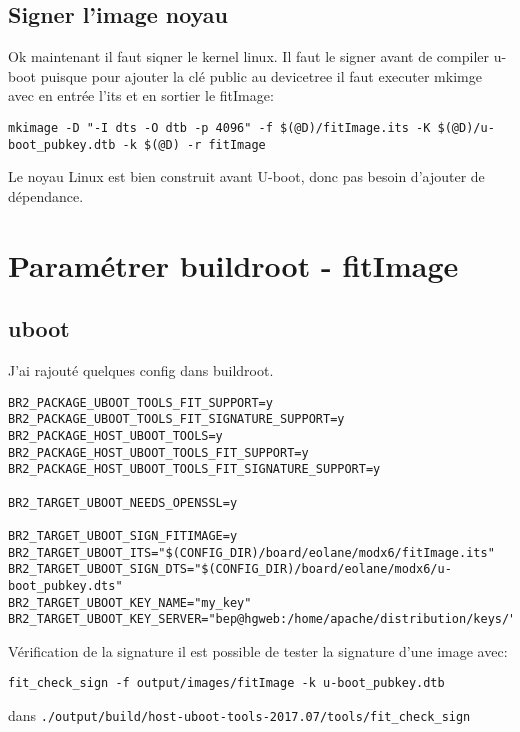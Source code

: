 \documentclass[compress,aspectratio=169]{beamer}
\begin{document}
\subsection{Signer l'image noyau}
\begin{frame}[fragile]
Ok maintenant il faut siqner le kernel linux.\newline
Il faut le signer avant de compiler u-boot puisque pour ajouter la clé public au devicetree il faut executer mkimge avec en entrée l'its et en sortier le fitImage:
\begin{lstlisting}[style=shell]
mkimage -D "-I dts -O dtb -p 4096" -f $(@D)/fitImage.its -K $(@D)/u-boot_pubkey.dtb -k $(@D) -r fitImage
\end{lstlisting}
Le noyau Linux est bien construit avant U-boot, donc pas besoin d'ajouter de dépendance.
\end{frame}

\section{Paramétrer buildroot - fitImage}

\subsection{uboot}
\begin{frame}[fragile]
J'ai rajouté quelques config dans buildroot.
\begin{lstlisting}[style=shell]
BR2_PACKAGE_UBOOT_TOOLS_FIT_SUPPORT=y
BR2_PACKAGE_UBOOT_TOOLS_FIT_SIGNATURE_SUPPORT=y
BR2_PACKAGE_HOST_UBOOT_TOOLS=y
BR2_PACKAGE_HOST_UBOOT_TOOLS_FIT_SUPPORT=y
BR2_PACKAGE_HOST_UBOOT_TOOLS_FIT_SIGNATURE_SUPPORT=y

BR2_TARGET_UBOOT_NEEDS_OPENSSL=y

BR2_TARGET_UBOOT_SIGN_FITIMAGE=y
BR2_TARGET_UBOOT_ITS="$(CONFIG_DIR)/board/eolane/modx6/fitImage.its"
BR2_TARGET_UBOOT_SIGN_DTS="$(CONFIG_DIR)/board/eolane/modx6/u-boot_pubkey.dts"
BR2_TARGET_UBOOT_KEY_NAME="my_key"
BR2_TARGET_UBOOT_KEY_SERVER="bep@hgweb:/home/apache/distribution/keys/"
\end{lstlisting}
\end{frame}

\begin{frame}[fragile]{Vérification de la signature}
il est possible de tester la signature d'une image avec:
\begin{lstlisting}[style=shell]
fit_check_sign -f output/images/fitImage -k u-boot_pubkey.dtb
\end{lstlisting}
dans \texttt{./output/build/host-uboot-tools-2017.07/tools/fit\_check\_sign}
\end{frame}
\end{document}
